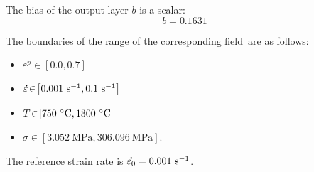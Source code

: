 \documentclass[algorithms,article,accept,pdftex,oneauthors]{Definitions/mdpi}
\DeclareRobustCommand{\mdot}[1]{\accentset{\mbox{\bfseries .}}{#1}}
\DeclareRobustCommand{\ps}{\text{s}^{-1}}
\DeclareRobustCommand{\MPa}{\text{MPa}}
\begin{document}
The bias of the output layer $b$ is a scalar:
\begin{equation*}
b = 0.1631
\end{equation*}

The boundaries of the range of the corresponding field~are as follows:
\begin{itemize}
\item $\varepsilon^p\!\in\!\left[0.0,0.7\right]$
\item $\mdot{\varepsilon}\!\in\!\left[0.001~\ps,0.1~\ps\right]$
\item $T\!\in\!\left[750~\celsius,1300~\celsius\right]$
\item $\sigma\!\in\!\left[3.052~\MPa,306.096~\MPa\right]$.
\end{itemize}

The reference strain rate is $\mdot{\varepsilon_0} = 0.001~\ps$.
\end{document}
